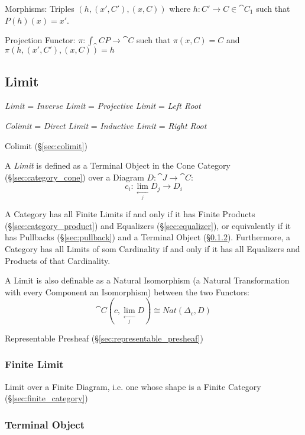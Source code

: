 Morphisms: Triples $(h, (x',C'), (x,C))$ where $h : C' \rightarrow C
\in \cat{C}_1$ such that $P(h)(x) = x'$.

Projection Functor: $\pi : \int_\cat{C} P \rightarrow \cat{C}$
such that $\pi(x,C) = C$ and $\pi(h, (x',C'), (x,C)) = h$



\subsection{Limit}\label{sec:limit}

\emph{Limit} = \emph{Inverse Limit} = \emph{Projective Limit} =
\emph{Left Root}

\emph{Colimit} = \emph{Direct Limit} = \emph{Inductive Limit} =
\emph{Right Root}

Colimit (\S\ref{sec:colimit})

A \emph{Limit} is defined as a Terminal Object in the Cone Category
(\S\ref{sec:category_cone}) over a Diagram $D : \cat{J} \rightarrow
\cat{C}$:
\[
  c_i : \lim_{\xleftarrow[j]{}} D_j \rightarrow D_i
\]

A Category has all Finite Limits if and only if it has Finite Products
(\S\ref{sec:category_product}) and Equalizers (\S\ref{sec:equalizer}),
or equivalently if it has Pullbacks (\S\ref{sec:pullback}) and a
Terminal Object (\S\ref{sec:terminal_object}). Furthermore, a Category
has all Limits of som Cardinality if and only if it has all Equalizers
and Products of that Cardinality. \cite{awodey06}

A Limit is also definable as a Natural Isomorphism (a Natural
Transformation with every Component an Isomorphism) between the two
Functors:
\[
  \cat{C}(c, \lim_{\xleftarrow[j]{}} D) \cong Nat (\Delta_c, D)
\]

Representable Presheaf (\S\ref{sec:representable_presheaf})



\subsubsection{Finite Limit}\label{sec:finite_limit}

Limit over a Finite Diagram, i.e. one whose shape is a Finite Category
(\S\ref{sec:finite_category})



\subsubsection{Terminal Object}\label{sec:terminal_object}

